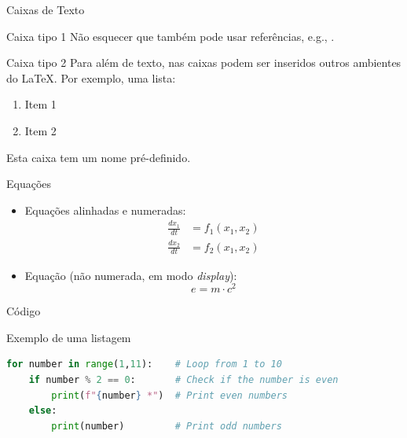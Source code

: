 \documentclass[
aspectratio=169,	%
LEEC,				%
portuguese,			%
]{DEEclassP}
\begin{document}
\begin{frame}{Caixas de Texto}

\begin{block}{Caixa tipo 1}
Não esquecer que também pode usar referências, e.g., \cite{Gupta97}.
\end{block}

\begin{alertblock}{Caixa tipo 2}
Para além de texto, nas caixas podem ser inseridos outros ambientes do \LaTeX{}. Por exemplo, uma lista:
\begin{enumerate}
	\item Item 1
    \item Item 2
\end{enumerate} 
\end{alertblock}

\begin{examples}
Esta caixa tem um nome pré-definido. 
\end{examples}

\end{frame}

\begin{frame}{Equações}
  	
\begin{itemize}
	\item Equações alinhadas e numeradas:
	\begin{align}
		\frac{dx_1}{dt} &= f_1\left(x_1,x_2\right)\\
		\frac{dx_2}{dt} &= f_2\left(x_1,x_2\right)
	\end{align}
	\vspace{0.3cm}
	\item  Equação (não numerada, em modo \textit{display}): 	
	$$e = m \cdot c^2$$
\end{itemize}  	    

\end{frame}

\begin{frame}[fragile]{Código}

\begin{center}
\begin{minipage}{0.85\textwidth}
\begin{block}{\small{Exemplo de uma listagem}}
\begin{lstlisting}[language=Python]
for number in range(1,11):    # Loop from 1 to 10
    if number % 2 == 0:       # Check if the number is even
        print(f"{number} *")  # Print even numbers
    else:
        print(number)         # Print odd numbers
\end{lstlisting}
\end{block}
\end{minipage}
\end{center}

\end{frame}
\end{document}
